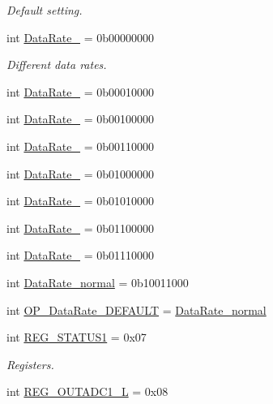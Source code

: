 \begin{DoxyCompactItemize}
\begin{DoxyCompactList}\small\item\em Default setting. \end{DoxyCompactList}\item 
int \mbox{\hyperlink{classlis3dh_1_1_l_i_s3_d_h_a5b8784f0958691212a1064b84a7dc851}{Data\+Rate\+\_}} = 0b00000000
\begin{DoxyCompactList}\small\item\em Different data rates. \end{DoxyCompactList}\item 
int \mbox{\hyperlink{classlis3dh_1_1_l_i_s3_d_h_a93e1e05f500575ecc3058d43f00838df}{Data\+Rate\+\_}} = 0b00010000
\item 
int \mbox{\hyperlink{classlis3dh_1_1_l_i_s3_d_h_a2e12ca4d97390bdedc989d3c7832adb3}{Data\+Rate\+\_}} = 0b00100000
\item 
int \mbox{\hyperlink{classlis3dh_1_1_l_i_s3_d_h_a7a282789895b34291dc34736e2fbec8f}{Data\+Rate\+\_}} = 0b00110000
\item 
int \mbox{\hyperlink{classlis3dh_1_1_l_i_s3_d_h_a45a8bbcaf7a6d0030ac2b317a778ebf1}{Data\+Rate\+\_}} = 0b01000000
\item 
int \mbox{\hyperlink{classlis3dh_1_1_l_i_s3_d_h_afc4387b61c959ee8d3ad7c9f0b91bc4a}{Data\+Rate\+\_}} = 0b01010000
\item 
int \mbox{\hyperlink{classlis3dh_1_1_l_i_s3_d_h_ac634ca6c33d2800e78fec722ad7d1ca1}{Data\+Rate\+\_}} = 0b01100000
\item 
int \mbox{\hyperlink{classlis3dh_1_1_l_i_s3_d_h_ad3551c79f32da5edf48d43c8ad432226}{Data\+Rate\+\_}} = 0b01110000
\item 
int \mbox{\hyperlink{classlis3dh_1_1_l_i_s3_d_h_ab5f2dc2899c8d5538afdd1b923a1dd2b}{Data\+Rate\+\_\+normal}} = 0b10011000
\item 
int \mbox{\hyperlink{classlis3dh_1_1_l_i_s3_d_h_a5a7e6620a64989808fcecbc055b29cb9}{O\+P\+\_\+\+Data\+Rate\+\_\+\+D\+E\+F\+A\+U\+LT}} = \mbox{\hyperlink{classlis3dh_1_1_l_i_s3_d_h_ab5f2dc2899c8d5538afdd1b923a1dd2b}{Data\+Rate\+\_\+normal}}
\item 
int \mbox{\hyperlink{classlis3dh_1_1_l_i_s3_d_h_a556895b2098f9f1c18a32596b070c397}{R\+E\+G\+\_\+\+S\+T\+A\+T\+U\+S1}} = 0x07
\begin{DoxyCompactList}\small\item\em Registers. \end{DoxyCompactList}\item 
int \mbox{\hyperlink{classlis3dh_1_1_l_i_s3_d_h_a4ffa9819033f441fcf6b1c173867e5fa}{R\+E\+G\+\_\+\+O\+U\+T\+A\+D\+C1\+\_\+L}} = 0x08

\end{DoxyCompactItemize}
